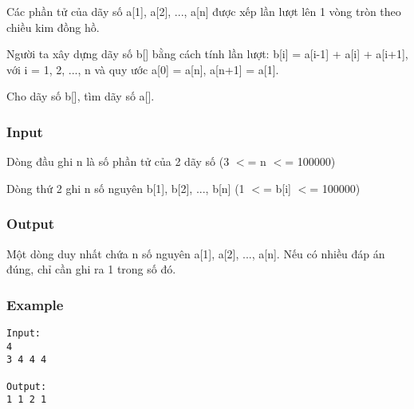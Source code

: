 



   Các phần tử của dãy số a[1], a[2], ..., a[n] được xếp lần lượt lên 1 vòng tròn theo chiều kim đồng hồ.  

   Người ta xây dựng dãy số b[] bằng cách tính lần lượt: b[i] = a[i-1] + a[i] + a[i+1], với i = 1, 2, ..., n và quy ước a[0] = a[n], a[n+1] = a[1].  

   Cho dãy số b[], tìm dãy số a[].  

\subsubsection{   Input  }

   Dòng đầu ghi n là số phần tử của 2 dãy số (3 $<$= n $<$= 100000)  

   Dòng thứ 2 ghi n số nguyên b[1], b[2], ..., b[n] (1 $<$= b[i] $<$= 100000)  

\subsubsection{   Output  }

   Một dòng duy nhất chứa n số nguyên a[1], a[2], ..., a[n]. Nếu có nhiều đáp án đúng, chỉ cần ghi ra 1 trong số đó.  

\subsubsection{   Example  }
\begin{verbatim}
Input:
4
3 4 4 4

Output:
1 1 2 1
\end{verbatim}